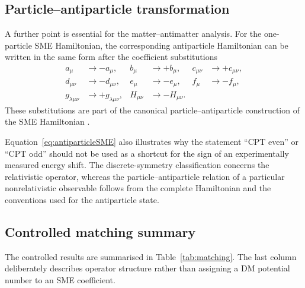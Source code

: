 \documentclass[aps,prd,reprint,superscriptaddress,nofootinbib]{revtex4-2}
\begin{document}
	\subsection{Particle--antiparticle transformation}
	
	A further point is essential for the matter--antimatter analysis.
	For the one-particle SME Hamiltonian, the corresponding antiparticle
	Hamiltonian can be written in the same form after the coefficient
	substitutions
	\begin{equation}
		\begin{aligned}
			a_\mu&\rightarrow -a_\mu,
			&
			b_\mu&\rightarrow +b_\mu,
			&
			c_{\mu\nu}&\rightarrow +c_{\mu\nu},
			\\
			d_{\mu\nu}&\rightarrow -d_{\mu\nu},
			&
			e_\mu&\rightarrow -e_\mu,
			&
			f_\mu&\rightarrow -f_\mu,
			\\
			g_{\lambda\mu\nu}&\rightarrow +g_{\lambda\mu\nu},
			&
			H_{\mu\nu}&\rightarrow -H_{\mu\nu}.
		\end{aligned}
		\label{eq:antiparticleSME}
	\end{equation}
	These substitutions are part of the canonical particle--antiparticle
	construction of the SME Hamiltonian \cite{KosteleckyLane1999}.
	
	Equation~\eqref{eq:antiparticleSME} also illustrates why the statement
	``CPT even'' or ``CPT odd'' should not be used as a shortcut for the
	sign of an experimentally measured energy shift. The discrete-symmetry
	classification concerns the relativistic operator, whereas the
	particle--antiparticle relation of a particular nonrelativistic
	observable follows from the complete Hamiltonian and the conventions
	used for the antiparticle state.
	
	\subsection{Controlled matching summary}
	
	The controlled results are summarised in Table~\ref{tab:matching}.
	The last column deliberately describes operator structure rather than
	assigning a DM potential number to an SME coefficient.
	
\end{document}
